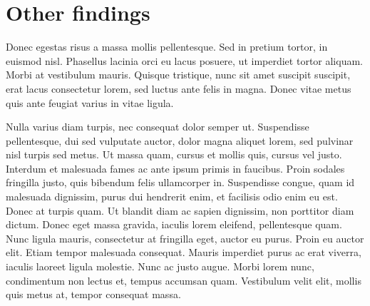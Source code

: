 \section{Other findings}
Donec egestas risus a massa
mollis pellentesque. Sed in pretium tortor, in euismod nisl. Phasellus
lacinia orci eu lacus posuere, ut imperdiet tortor aliquam. Morbi at
vestibulum mauris. Quisque tristique, nunc sit amet suscipit suscipit, erat
lacus consectetur lorem, sed luctus ante felis in magna. Donec vitae metus
quis ante feugiat varius in vitae ligula.

Nulla varius diam turpis, nec consequat dolor semper ut. Suspendisse
pellentesque, dui sed vulputate auctor, dolor magna aliquet lorem, sed
pulvinar nisl turpis sed metus. Ut massa quam, cursus et mollis quis, cursus
vel justo. Interdum et malesuada fames ac ante ipsum primis in faucibus.
Proin sodales fringilla justo, quis bibendum felis ullamcorper in.
Suspendisse congue, quam id malesuada dignissim, purus dui hendrerit enim,
et facilisis odio enim eu est. Donec at turpis quam. Ut blandit diam ac
sapien dignissim, non porttitor diam dictum. Donec eget massa gravida,
iaculis lorem eleifend, pellentesque quam. Nunc ligula mauris, consectetur
at fringilla eget, auctor eu purus. Proin eu auctor elit. Etiam tempor
malesuada consequat. Mauris imperdiet purus ac erat viverra, iaculis laoreet
ligula molestie. Nunc ac justo augue. Morbi lorem nunc, condimentum non
lectus et, tempus accumsan quam. Vestibulum velit elit, mollis quis metus
at, tempor consequat massa.
